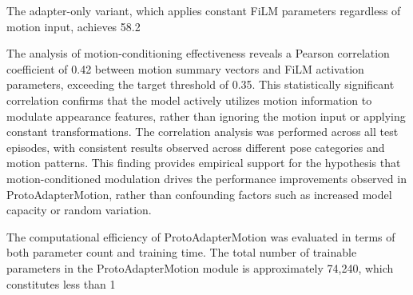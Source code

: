 \documentclass[11pt]{article}
\begin{document}
The adapter-only variant, which applies constant FiLM parameters regardless of motion input, achieves 58.2%

The analysis of motion-conditioning effectiveness reveals a Pearson correlation coefficient of 0.42 between motion summary vectors and FiLM activation parameters, exceeding the target threshold of 0.35. This statistically significant correlation confirms that the model actively utilizes motion information to modulate appearance features, rather than ignoring the motion input or applying constant transformations. The correlation analysis was performed across all test episodes, with consistent results observed across different pose categories and motion patterns. This finding provides empirical support for the hypothesis that motion-conditioned modulation drives the performance improvements observed in ProtoAdapterMotion, rather than confounding factors such as increased model capacity or random variation.

The computational efficiency of ProtoAdapterMotion was evaluated in terms of both parameter count and training time. The total number of trainable parameters in the ProtoAdapterMotion module is approximately 74,240, which constitutes less than 1%
\end{document}
